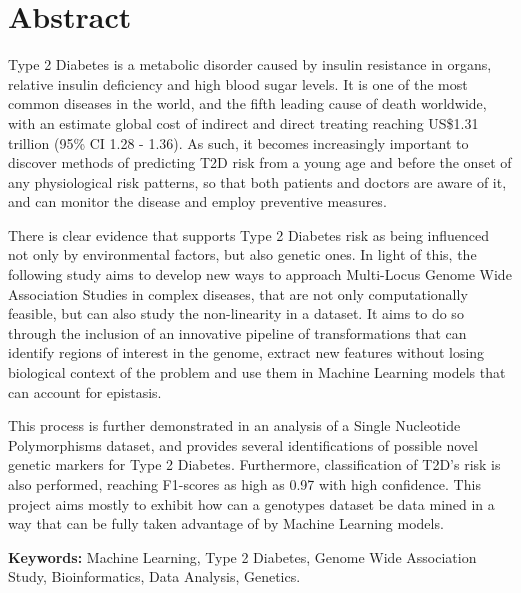 
\chapter*{Abstract}

Type 2 Diabetes is a metabolic disorder caused by insulin resistance in organs, relative insulin deficiency and high blood sugar levels. It is one of the most common diseases in the world, and the fifth leading cause of death worldwide, with an estimate global cost of indirect and direct treating reaching US\$1.31 trillion (95\% CI 1.28 - 1.36). As such, it becomes increasingly important to discover methods of predicting T2D risk from a young age and before the onset of any physiological risk patterns, so that both patients and doctors are aware of it, and can monitor the disease and employ preventive measures.

There is clear evidence that supports Type 2 Diabetes risk as being influenced not only by environmental factors, but also genetic ones. In light of this, the following study aims to develop new ways to approach Multi-Locus Genome Wide Association Studies in complex diseases, that are not only computationally feasible, but can also study the non-linearity in a dataset. It aims to do so through the inclusion of an innovative pipeline of transformations that can identify regions of interest in the genome, extract new features without losing biological context of the problem and use them in Machine Learning models that can account for epistasis. 

This process is further demonstrated in an analysis of a Single Nucleotide Polymorphisms dataset, and provides several identifications of possible novel genetic markers for Type 2 Diabetes. Furthermore, classification of T2D's risk is also performed, reaching F1-scores as high as 0.97 with high confidence. This project aims mostly to exhibit how can a genotypes dataset be data mined in a way that can be fully taken advantage of by Machine Learning models.

\textbf{Keywords:} Machine Learning, Type 2 Diabetes, Genome Wide Association Study, Bioinformatics, Data Analysis, Genetics.